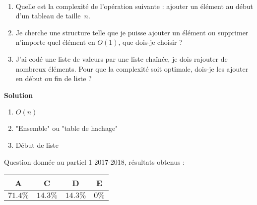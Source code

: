 \begin{exercice}[Partiel 2017-18]~

\begin{enumerate}
\item Quelle est la complexité de l'opération suivante : ajouter un élément au début d'un tableau de taille~$n$.
\item Je cherche une structure telle que je puisse ajouter un élément ou supprimer n'importe quel élément en $O(1)$, que dois-je choisir ?
\item J'ai codé une liste de valeurs par une liste chaînée, je dois rajouter de nombreux éléments. Pour que la complexité soit optimale, dois-je les ajouter en début ou fin de liste ?
\end{enumerate}


\vspace{0.5cm}

\textbf{Solution}


\begin{enumerate}
\item $O(n)$
\item "Ensemble" ou "table de hachage"
\item Début de liste
\end{enumerate}

Question donnée au partiel 1 2017-2018, résultats obtenus :

\begin{tabular}{|c|c|c|c|}
\hline
A & C & D & E \\ \hline
$71.4\%$ & $14.3\%$ & $14.3\%$ & $0\%$ \\ \hline
\end{tabular} 




\end{exercice}
